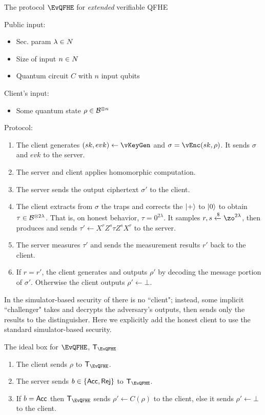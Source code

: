 \begin{protocol}{The protocol $\EvQFHE$ for \emph{extended} verifiable QFHE}

	Public input:
	\begin{itemize}
		\item Sec. param $\lambda\in\relax{N}$
		\item Size of input $n\in\relax{N}$
		\item Quantum circuit $C$ with $n$ input qubits
	\end{itemize}

	Client's input:
	\begin{itemize}
		\item Some quantum state $\rho\in\mathcal{B}^{\otimes n}$
	\end{itemize}

	Protocol:
	\begin{enumerate}
		\item The client generates $(sk, evk)\leftarrow\vKeyGen$ and $\sigma=\vEnc(sk, \rho)$. It sends $\sigma$ and $evk$ to the server.
		\item The server and client applies homomorphic computation. 
		\item The server sends the output ciphertext $\sigma'$ to the client.
		\item The client extracts from $\sigma$ the traps and corrects the $\ket{+}$ to $\ket{0}$ to obtain $\tau\in\mathcal{B}^{\otimes 2\lambda}$. That is, on honest behavior, $\tau=0^{2\lambda}$.
			It samples $r, s\xleftarrow{\$}\zo^{2\lambda}$, then produces and sends $\tau'\leftarrow X^rZ^s\tau Z^sX^r$ to the server.
		\item The server measures $\tau'$ and sends the measurement results $r'$ back to the client.
		\item If $r=r'$, the client generates and outputs $\rho'$ by decoding the message portion of $\sigma'$. Otherwise the client outputs $\rho'\leftarrow\bot$.
	\end{enumerate}

\end{protocol}

In the simulator-based security of \cite{magic_circuits} there is no ``client";
instead, some implicit ``challenger" takes and decrypts the adversary's outputs, then sends only the results to the distinguisher.
Here we explicitly add the honest client to use the standard simulator-based security.

\begin{protocol}{The ideal box for $\EvQFHE$, $\trustp_\EvQFHE$}

	\begin{enumerate}
		\item The client sends $\rho$ to $\trustp_\EvQFHE$.
		\item The server sends $b\in\left\{{\mathsf{Acc}}, {\mathsf{Rej}}\right\}$ to $\trustp_\EvQFHE$.
		\item If $b={\mathsf{Acc}}$ then $\trustp_\EvQFHE$ sends $\rho'\leftarrow C(\rho)$ to the client, else it sends $\rho'\leftarrow\bot$ to the client.
	\end{enumerate}

\end{protocol}

